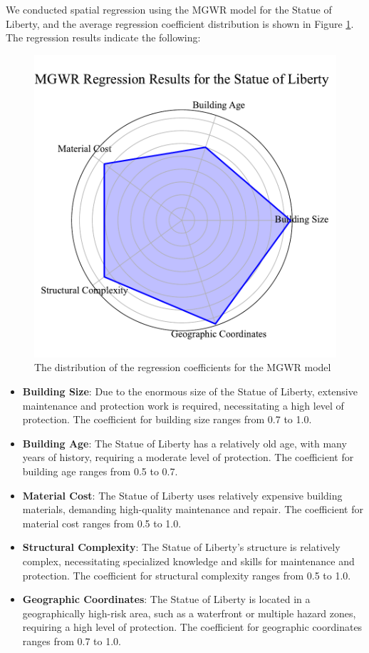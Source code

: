 \documentclass[12pt]{article}
\begin{document}
We conducted spatial regression using the MGWR model for the Statue of Liberty, and the average regression coefficient distribution is shown in Figure \ref{fig:radal}. The regression results indicate the following:
\begin{figure}[htbp]
    \centering
    \includegraphics[width=0.5\linewidth]{figure/radar.pdf}
    \caption{The distribution of the regression coefficients for the MGWR model}
    \label{fig:radal}
\end{figure}
\begin{itemize}
  \item \textbf{Building Size}: Due to the enormous size of the Statue of Liberty, extensive maintenance and protection work is required, necessitating a high level of protection. The coefficient for building size ranges from 0.7 to 1.0.

  \item \textbf{Building Age}: The Statue of Liberty has a relatively old age, with many years of history, requiring a moderate level of protection. The coefficient for building age ranges from 0.5 to 0.7.

  \item \textbf{Material Cost}: The Statue of Liberty uses relatively expensive building materials, demanding high-quality maintenance and repair. The coefficient for material cost ranges from 0.5 to 1.0.

  \item \textbf{Structural Complexity}: The Statue of Liberty's structure is relatively complex, necessitating specialized knowledge and skills for maintenance and protection. The coefficient for structural complexity ranges from 0.5 to 1.0.

  \item \textbf{Geographic Coordinates}: The Statue of Liberty is located in a geographically high-risk area, such as a waterfront or multiple hazard zones, requiring a high level of protection. The coefficient for geographic coordinates ranges from 0.7 to 1.0.
\end{itemize}
\end{document}
